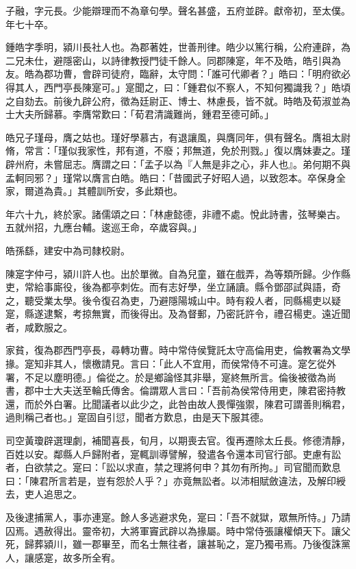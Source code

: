 \begin{pinyinscope}
子融，字元長。少能辯理而不為章句學。聲名甚盛，五府並辟。獻帝初，至太僕。年七十卒。

鍾皓字季明，潁川長社人也。為郡著姓，世善刑律。皓少以篤行稱，公府連辟，為二兄未仕，避隱密山，以詩律教授門徒千餘人。同郡陳寔，年不及皓，皓引與為友。皓為郡功曹，會辟司徒府，臨辭，太守問：「誰可代卿者？」皓曰：「明府欲必得其人，西門亭長陳寔可。」寔聞之，曰：「鍾君似不察人，不知何獨識我？」皓頃之自劾去。前後九辟公府，徵為廷尉正、博士、林慮長，皆不就。時皓及荀淑並為士大夫所歸慕。李膺常歎曰：「荀君清識難尚，鍾君至德可師。」

皓兄子瑾母，膺之姑也。瑾好學慕古，有退讓風，與膺同年，俱有聲名。膺祖太尉脩，常言：「瑾似我家性，邦有道，不廢；邦無道，免於刑戮。」復以膺妹妻之。瑾辟州府，未嘗屈志。膺謂之曰：「孟子以為『人無是非之心，非人也』。弟何期不與孟軻同邪？」瑾常以膺言白皓。皓曰：「昔國武子好昭人過，以致怨本。卒保身全家，爾道為貴。」其體訓所安，多此類也。

年六十九，終於家。諸儒頌之曰：「林慮懿德，非禮不處。悅此詩書，弦琴樂古。五就州招，九應台輔。逡巡王命，卒歲容與。」

皓孫繇，建安中為司隸校尉。

陳寔字仲弓，潁川許人也。出於單微。自為兒童，雖在戲弄，為等類所歸。少作縣吏，常給事廝役，後為都亭刺佐。而有志好學，坐立誦讀。縣令鄧邵試與語，奇之，聽受業太學。後令復召為吏，乃避隱陽城山中。時有殺人者，同縣楊吏以疑寔，縣遂逮繫，考掠無實，而後得出。及為督郵，乃密託許令，禮召楊吏。遠近聞者，咸歎服之。

家貧，復為郡西門亭長，尋轉功曹。時中常侍侯覽託太守高倫用吏，倫教署為文學掾。寔知非其人，懷檄請見。言曰：「此人不宜用，而侯常侍不可違。寔乞從外署，不足以塵明德。」倫從之。於是鄉論怪其非舉，寔終無所言。倫後被徵為尚書，郡中士大夫送至輪氏傳舍。倫謂眾人言曰：「吾前為侯常侍用吏，陳君密持教還，而於外白署。比聞議者以此少之，此咎由故人畏憚強禦，陳君可謂善則稱君，過則稱己者也。」寔固自引愆，聞者方歎息，由是天下服其德。

司空黃瓊辟選理劇，補聞喜長，旬月，以期喪去官。復再遷除太丘長。修德清靜，百姓以安。鄰縣人戶歸附者，寔輒訓導譬解，發遣各令還本司官行部。吏慮有訟者，白欲禁之。寔曰：「訟以求直，禁之理將何申？其勿有所拘。」司官聞而歎息曰：「陳君所言若是，豈有怨於人乎？」亦竟無訟者。以沛相賦斂違法，及解印綬去，吏人追思之。

及後逮捕黨人，事亦連寔。餘人多逃避求免，寔曰：「吾不就獄，眾無所恃。」乃請囚焉。遇赦得出。靈帝初，大將軍竇武辟以為掾屬。時中常侍張讓權傾天下。讓父死，歸葬潁川，雖一郡畢至，而名士無往者，讓甚恥之，寔乃獨弔焉。乃後復誅黨人，讓感寔，故多所全宥。


\end{pinyinscope}
